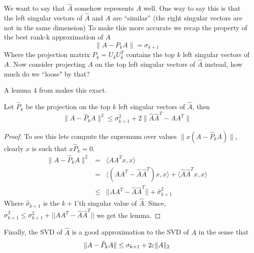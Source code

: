 \documentclass{article}
\begin{document}
We want to say that $\hat{A}$ somehow represents $A$ well. One way to say this is that the left singular vectors of $\hat{A}$
and $A$ are ``similar'' (the right singular vectors are not in the same dimension) 
To make this more accurate we recap the property of the best rank-k approximation of $A$
\[
\|A - P_k A\| = \sigma_{k+1}
\]
Where the projection matrix $P_k = U_{k}U_{k}^{T}$ contains the top $k$ left singular vectors of $A$.
Now consider projecting $A$ on the top left singular vectors of $\hat{A}$ instead, how much do we ``loose" by that?

A lemma 4 from \cite{Drineas03passefficient} makes this exact.

\begin{lemma}
Let $\hat{P}_k$ be the projection on the top $k$ left singular vectors of $\hat{A}$, then
\[
\|A - \hat{P}_k A\|^2 \le \sigma^2_{k+1} + 2\|\hat{A}\hat{A}^T -  AA^{T}\|
\]
\end{lemma}
\begin{proof}
To see this lets compute the supremum over values $\|x(A - \hat{P}_k A)\|$, clearly $x$ is such that $x\hat{P}_k = 0$.
\begin{eqnarray}
\|A - \hat{P}_k A\|^2 &=& \langle AA^T x,x\rangle \\
&=& \langle (AA^T - \hat{A}\hat{A}^T) x,x \rangle + \langle \hat{A}\hat{A}^Tx, x\rangle \\
&\le& ||AA^T - \hat{A}\hat{A}^T|| + \hat{\sigma}^2_{k+1}
\end{eqnarray}
Where $\hat{\sigma}_{k+1}$ is the $k+1$'th singular value of $\hat{A}$.
Since, $\hat{\sigma}^{2}_{k+1} \le  \sigma^{2}_{k+1} +  ||AA^T - \hat{A}\hat{A}^T||$ we get the lemma.
\end{proof}

Finally, the SVD of $\hat{A}$ is a good approximation to the SVD of $A$ in the sense that 
\[
\|A - \hat{P}_k A\| \le \sigma_{k+1} + 2\varepsilon\|A\|_2
\]





\end{document}
